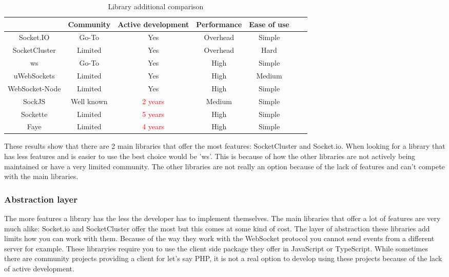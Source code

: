 \begin{table}[h]
  \centering
  \begin{tabular}{|c|c|c|c|c|c|c|}
    \hline
                   & Community  & Active development       & Performance & Ease of use \\ \hline
    Socket.IO      & Go-To      & Yes                      & Overhead    & Simple      \\ \hline
    SocketCluster  & Limited    & Yes                      & Overhead    & Hard        \\ \hline
    ws             & Go-To      & Yes                      & High        & Simple      \\ \hline
    uWebSockets    & Limited    & Yes                      & High        & Medium      \\ \hline
    WebSocket-Node & Limited    & Yes                      & High        & Simple      \\ \hline
    SockJS         & Well known & \textcolor{red}{2 years} & Medium      & Simple      \\ \hline
    Sockette       & Limited    & \textcolor{red}{5 years} & High        & Simple      \\ \hline
    Faye           & Limited    & \textcolor{red}{4 years} & High        & Simple      \\ \hline
  \end{tabular}
  \caption{Library additional comparison}
\end{table}

These results show that there are 2 main libraries that offer the most features: SocketCluster and Socket.io. When looking for a library that has less features and is easier to use the best choice would be 'ws'. This is because of how the other libraries are not actively being maintained or have a very limited community. The other libraries are not really an option because of the lack of features and can't compete with the main libraries.

\subsubsection{Abstraction layer}

The more features a library has the less the developer has to implement themselves. The main libraries that offer a lot of features are very much alike: Socket.io and SocketCluster offer the most but this comes at some kind of cost. The layer of abstraction these libraries add limits how you can work with them. Because of the way they work with the WebSocket protocol you cannot send events from a different server for example. These libraryies require you to use the client side package they offer in JavaScript or TypeScript. While sometimes there are community projects providing a client for let's say PHP, it is not a real option to develop using these projects because of the lack of active development.

